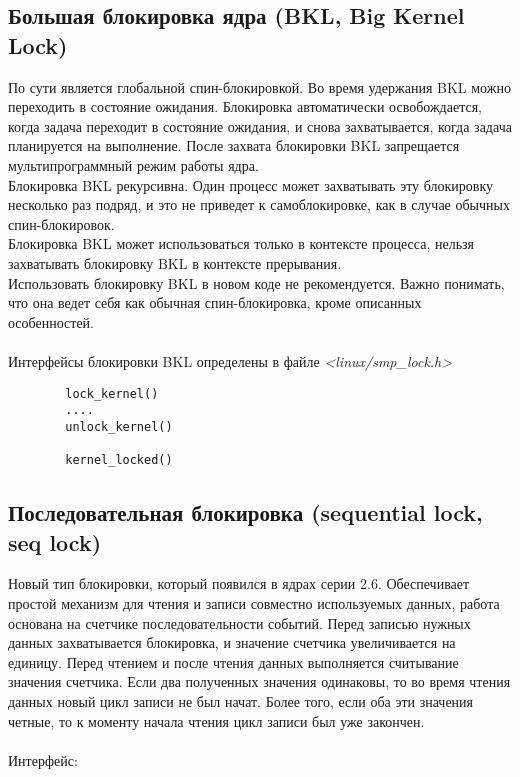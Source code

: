 \subsection{Большая блокировка ядра (BKL, Big Kernel Lock)} 
    По сути является глобальной спин-блокировкой. Во время удержания BKL можно переходить в состояние ожидания. Блокировка автоматически освобождается, когда задача переходит в состояние ожидания, и снова захватывается, когда задача планируется на выполнение. После захвата блокировки BKL запрещается мультипрограммный режим работы ядра.
    \\
    Блокировка BKL рекурсивна. Один процесс может захватывать эту блокировку несколько раз подряд, и это не приведет к самоблокировке, как в случае обычных спин-блокировок.
    \\
    Блокировка BKL может использоваться только в контексте процесса, нельзя захватывать блокировку BKL в контексте прерывания.
    \\
    Использовать блокировку BKL в новом коде не рекомендуется. Важно понимать, что она ведет себя как обычная спин-блокировка, кроме описанных особенностей.
    \\\\
    Интерфейсы блокировки BKL определены в файле \textit{<linux/smp\_lock.h>}
    
    \begin{lstlisting}
        lock_kernel()
        ....
        unlock_kernel()
        
        kernel_locked()
    \end{lstlisting}

\subsection{Последовательная блок\textit{}ировка (sequential lock, seq lock)}
    Новый тип блокировки, который появился в ядрах серии 2.6. Обеспечивает простой механизм для чтения и записи совместно используемых данных, работа основана на счетчике последовательности событий. Перед записью нужных данных захватывается блокировка, и значение счетчика увеличивается на единицу. Перед чтением и после чтения данных выполняется считывание значения счетчика. Если два полученных значения одинаковы, то во время чтения данных новый цикл записи не был начат. Более того, если оба эти значения четные, то к моменту начала чтения цикл записи был уже закончен.
    \\\\
    Интерфейс:
    
